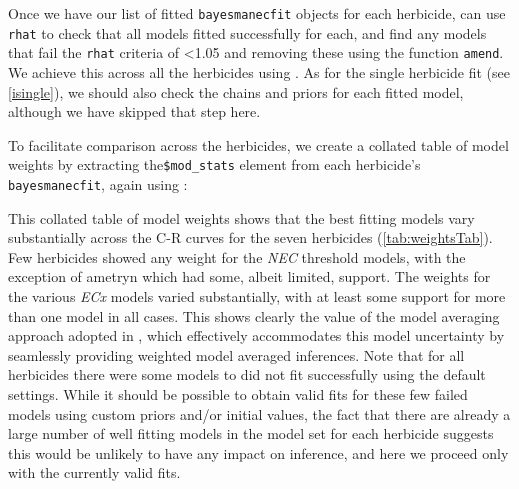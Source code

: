 \documentclass[
  shortnames]{jss}
\begin{document}
Once we have our list of fitted \texttt{bayesmanecfit} objects for each herbicide, can use \texttt{rhat} to check that all models fitted successfully for each, and find any models that fail the \texttt{rhat} criteria of \textless1.05 and removing these using the function \texttt{amend}. We achieve this across all the herbicides using . As for the single herbicide fit (see \ref{isingle}), we should also check the chains and priors for each fitted model, although we have skipped that step here.

\begin{CodeChunk}
\end{CodeChunk}

To facilitate comparison across the herbicides, we create a collated table of model weights by extracting the\texttt{\$mod\_stats} element from each herbicide's \texttt{bayesmanecfit}, again using :

\begin{CodeChunk}
\end{CodeChunk}

This collated table of model weights shows that the best fitting models vary substantially across the C-R curves for the seven herbicides (\autoref{tab:weightsTab}). Few herbicides showed any weight for the \emph{NEC} threshold models, with the exception of ametryn which had some, albeit limited, support. The weights for the various \emph{ECx} models varied substantially, with at least some support for more than one model in all cases. This shows clearly the value of the model averaging approach adopted in , which effectively accommodates this model uncertainty by seamlessly providing weighted model averaged inferences. Note that for all herbicides there were some models to did not fit successfully using the default  settings. While it should be possible to obtain valid fits for these few failed models using custom priors and/or initial values, the fact that there are already a large number of well fitting models in the model set for each herbicide suggests this would be unlikely to have any impact on inference, and here we proceed only with the currently valid fits.
\end{document}
